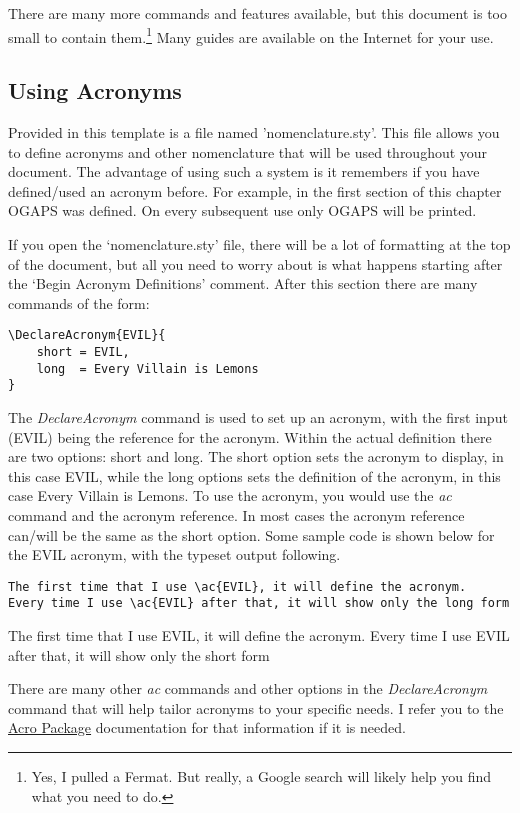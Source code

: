 There are many more commands and features available, but this document is too small to contain them.\footnote{Yes, I pulled a Fermat. But really, a Google search will likely help you find what you need to do.} Many guides are available on the Internet for your use.

\subsection{Using Acronyms}
Provided in this template is a file named 'nomenclature.sty'. This file allows you to define acronyms and other nomenclature that will be used throughout your document. The advantage of using such a system is it remembers if you have defined/used an acronym before. For example, in the first section of this chapter \ac{OGAPS} was defined. On every subsequent use only \ac{OGAPS} will be printed.

If you open the `nomenclature.sty' file, there will be a lot of formatting at the top of the document, but all you need to worry about is what happens starting after the `Begin Acronym Definitions' comment. After this section there are many commands of the form:
{\footnotesize\begin{verbatim}
\DeclareAcronym{EVIL}{
	short =	EVIL,
	long  = Every Villain is Lemons
}\end{verbatim}}

The \textit{DeclareAcronym} command is used to set up an acronym, with the first input (EVIL) being the reference for the acronym. Within the actual definition there are two options: short and long. The short option sets the acronym to display, in this case EVIL, while the long options sets the definition of the acronym, in this case Every Villain is Lemons. To use the acronym, you would use the \textit{ac} command and the acronym reference. In most cases the acronym reference can/will be the same as the short option. Some sample code is shown below for the EVIL acronym, with the typeset output following.

{\footnotesize\begin{verbatim}
The first time that I use \ac{EVIL}, it will define the acronym. 
Every time I use \ac{EVIL} after that, it will show only the long form
\end{verbatim}}
The first time that I use \ac{EVIL}, it will define the acronym. 
Every time I use \ac{EVIL} after that, it will show only the short form

There are many other \textit{ac} commands and other options in the \textit{DeclareAcronym} command that will help tailor acronyms to your specific needs. I refer you to the \href{http://ctan.math.utah.edu/ctan/tex-archive/macros/latex/contrib/acro/acro_en.pdf}{Acro Package} documentation for that information if it is needed.

